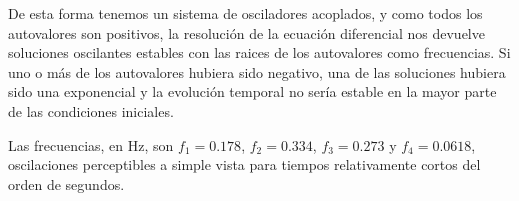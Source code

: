 \documentclass{article}
\begin{document}
De esta forma tenemos un sistema de osciladores acoplados, y como todos los autovalores son positivos, la resolución de la ecuación diferencial nos devuelve soluciones oscilantes estables con las raices de los autovalores como frecuencias. Si uno o más de los autovalores hubiera sido negativo, una de las soluciones hubiera sido una exponencial y la evolución temporal no sería estable en la mayor parte de las condiciones iniciales.

Las frecuencias, en Hz, son $f_1 = 0.178$, $f_2 = 0.334$, $f_3 = 0.273$ y $f_4 = 0.0618$, oscilaciones perceptibles a simple vista para tiempos relativamente cortos del orden de segundos.
\end{document}
